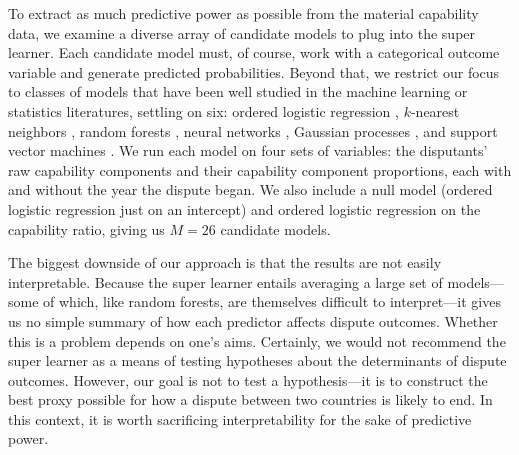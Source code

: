 To extract as much predictive power as possible from the material capability data, we examine a diverse array of candidate models to plug into the super learner.
Each candidate model must, of course, work with a categorical outcome variable and generate predicted probabilities.
Beyond that, we restrict our focus to classes of models that have been well studied in the machine learning or statistics literatures, settling on six: ordered logistic regression \citep{McKelvey:2010gv}, $k$-nearest neighbors \citep{Cover:1967jq}, random forests \citep{Breiman:2001fb}, neural networks \citep{Ripley:1996vd}, Gaussian processes \citep{Rasmussen:2006vz}, and support vector machines \citep{Cortes:1995ie}.
We run each model on four sets of variables: the disputants' raw capability components and their capability component proportions, each with and without the year the dispute began.
We also include a null model (ordered logistic regression just on an intercept) and ordered logistic regression on the capability ratio, giving us $M = 26$ candidate models.

The biggest downside of our approach is that the results are not easily interpretable.
Because the super learner entails averaging a large set of models---some of which, like random forests, are themselves difficult to interpret---it gives us no simple summary of how each predictor affects dispute outcomes.
Whether this is a problem depends on one's aims.
Certainly, we would not recommend the super learner as a means of testing hypotheses about the determinants of dispute outcomes.
However, our goal is not to test a hypothesis---it is to construct the best proxy possible for how a dispute between two countries is likely to end.
In this context, it is worth sacrificing interpretability for the sake of predictive power.

